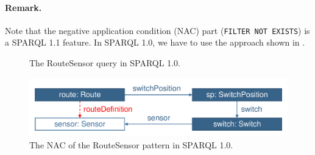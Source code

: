 \paragraph{Remark.} Note that the negative application condition (NAC) part (\texttt{FILTER NOT EXISTS}) is a SPARQL 1.1 feature. In SPARQL 1.0, we have to use the approach shown in .

\begin{figure}[Htb]
\centering
\begin{minipage}{0.6\textwidth}
  { \alignListing
    }
  \caption{The \textsf{RouteSensor} query in SPARQL 1.0.}
  \label{lst:routesensor-sparql-nac10}
\end{minipage}
\end{figure}

% 
% 
% 

\begin{figure}[Htb]
		\centering
		\includegraphics[scale=0.4]{figures/trainbenchmark-routesensor}
		\caption{The NAC of the \textsf{RouteSensor} pattern in SPARQL 1.0.}
		\label{fig:trainbenchmark-routesensor}
\end{figure}

